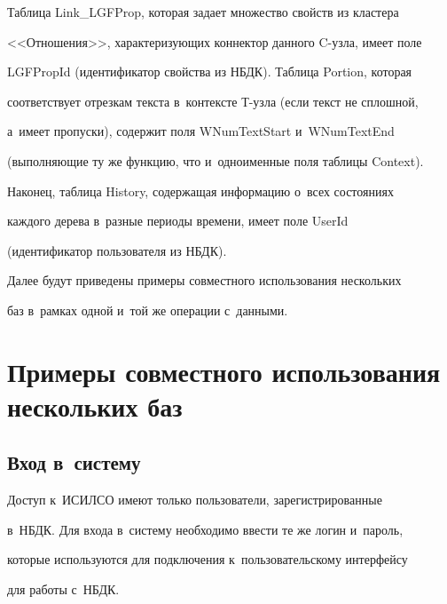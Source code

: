 Таблица Link\_LGFProp, которая задает множество свойств из кластера 


<<Отношения>>, характеризующих коннектор данного C-уз\-ла, имеет поле 


LGFPropId (идентификатор свойства из НБДК). Таб\-ли\-ца Portion, которая 


соответствует отрезкам текста в~контексте Т-уз\-ла (если текст не сплошной, 


а~имеет пропуски), содержит поля WNumTextStart и~WNumTextEnd 


(выполняющие ту же функцию, что и~одноименные поля таблицы Context). 


Наконец, таб\-ли\-ца History, содержащая информацию о~всех состояниях 


каж\-до\-го дерева в~разные периоды времени, имеет поле UserId 


(идентификатор пользователя из НБДК).


{





}


  


  Далее будут приведены примеры совместного использования нескольких 


баз в~рамках одной и~той же операции с~данными.


  


  \section{Примеры совместного использования нескольких баз}


  


  \subsection{Вход в~систему}


  


  Доступ к~ИСИЛСО имеют только пользователи, зарегистрированные 


в~НБДК. Для входа в~систему необходимо ввести те же логин и~пароль, 


которые используются для подключения к~пользовательскому интерфейсу 


для работы с~НБДК.


